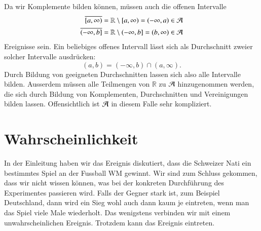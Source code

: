 Da wir Komplemente bilden können, müssen auch die offenen Intervalle
\begin{align*}
\overline{[a,\infty)}&=\mathbb R\setminus [a,\infty)=(-\infty,a)\in\cal A\\
\overline{(-\infty,b]}&=\mathbb R\setminus (-\infty,b]= (b,\infty)\in\cal A
\end{align*}
Ereignisse sein.
Ein beliebiges offenes Intervall lässt sich
als Durchschnitt zweier solcher Intervalle ausdrücken:
\[
(a,b)=(-\infty, b)\cap(a,\infty).
\]
Durch Bildung von geeigneten Durchschnitten lassen sich also alle
Intervalle bilden.
Ausserdem müssen alle Teilmengen von $\mathbb R$
zu $\cal A$ hinzugenommen werden, die sich durch Bildung von Komplementen,
Durchschnitten und Vereinigungen bilden lassen.
Offensichtlich ist $\cal A$
in diesem Falle sehr kompliziert.

\section{Wahrscheinlichkeit} \label{section-wahrscheinlichkeit}
In der Einleitung haben wir das Ereignis diskutiert, dass die Schweizer
Nati ein bestimmtes Spiel an der Fussball WM gewinnt.
Wir sind zum Schluss
gekommen, dass wir nicht wissen können, was bei der konkreten
Durchführung des Experimentes passieren wird.
Falls der Gegner
stark ist, zum Beispiel Deutschland, dann wird ein Sieg wohl auch
dann kaum je eintreten, wenn man das Spiel viele Male wiederholt.
Das wenigstens verbinden wir mit einem unwahrscheinlichen Ereignis.
Trotzdem kann das Ereignis eintreten.

